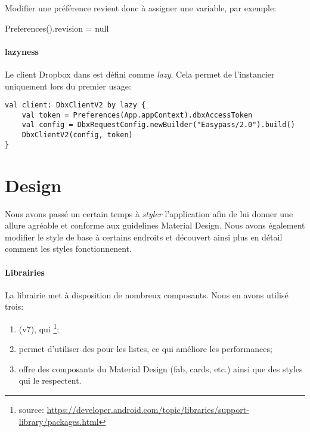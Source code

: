 Modifier une préférence revient donc à assigner une variable, par exemple:

\begin{kotlincode}
Preferences().revision = null
\end{kotlincode}

\paragraph*{lazyness} Le client Dropbox dans  est défini comme \emph{lazy}. Cela permet de l'instancier uniquement lors du premier usage:

\begin{verbatim}
val client: DbxClientV2 by lazy {
    val token = Preferences(App.appContext).dbxAccessToken
    val config = DbxRequestConfig.newBuilder("Easypass/2.0").build()
    DbxClientV2(config, token)
}
\end{verbatim}



\section{Design}

Nous avons passé un certain temps à \emph{styler} l'application afin de lui donner une allure agréable et conforme aux guidelines Material Design. Nous avons également modifier le style de base à certains endroits et découvert ainsi plus en détail comment les styles fonctionnenent.

\paragraph*{Librairies} La librairie  met à disposition de nombreux composants. Nous en avons utilisé trois:
\begin{enumerate}
    \item {} (v7), qui \footnote{source: \url{https://developer.android.com/topic/libraries/support-library/packages.html}};
    \item {} permet d'utiliser des  pour les listes, ce qui améliore les performances;
    \item {} offre des composants du Material Design (fab, cards, etc.) ainsi que des styles qui le respectent.
\end{enumerate}

